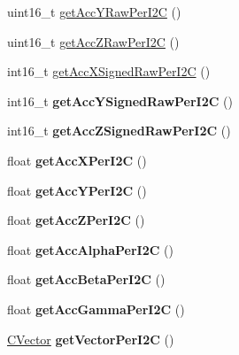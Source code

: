 \begin{DoxyCompactItemize}
\item 
uint16\-\_\-t \hyperlink{class_c_b_m_a180_a2b37888a1df1fd1d0c17c95bb6c7e15a}{get\-Acc\-Y\-Raw\-Per\-I2\-C} ()
\item 
uint16\-\_\-t \hyperlink{class_c_b_m_a180_accd1c61c0323e5acbd47cd1b1176084f}{get\-Acc\-Z\-Raw\-Per\-I2\-C} ()
\item 
int16\-\_\-t \hyperlink{class_c_b_m_a180_aca9a02a8a24b408f1a27de0f6303491f}{get\-Acc\-X\-Signed\-Raw\-Per\-I2\-C} ()
\item 
\hypertarget{class_c_b_m_a180_a76d299e0ede75e23c7c27b15391ffc2a}{int16\-\_\-t {\bfseries get\-Acc\-Y\-Signed\-Raw\-Per\-I2\-C} ()}\label{class_c_b_m_a180_a76d299e0ede75e23c7c27b15391ffc2a}

\item 
\hypertarget{class_c_b_m_a180_a70079e27326d0123a0b79ae2c2e1eb65}{int16\-\_\-t {\bfseries get\-Acc\-Z\-Signed\-Raw\-Per\-I2\-C} ()}\label{class_c_b_m_a180_a70079e27326d0123a0b79ae2c2e1eb65}

\item 
\hypertarget{class_c_b_m_a180_ab11c44f987669179c5172b1b77f9b633}{float {\bfseries get\-Acc\-X\-Per\-I2\-C} ()}\label{class_c_b_m_a180_ab11c44f987669179c5172b1b77f9b633}

\item 
\hypertarget{class_c_b_m_a180_ad60528a9b4b1c1ec6cad32b734930476}{float {\bfseries get\-Acc\-Y\-Per\-I2\-C} ()}\label{class_c_b_m_a180_ad60528a9b4b1c1ec6cad32b734930476}

\item 
\hypertarget{class_c_b_m_a180_a6d43bec30f5b932cc5615865af86a66a}{float {\bfseries get\-Acc\-Z\-Per\-I2\-C} ()}\label{class_c_b_m_a180_a6d43bec30f5b932cc5615865af86a66a}

\item 
\hypertarget{class_c_b_m_a180_a03c043a3e8ebb7cc7fac3c5153ba356d}{float {\bfseries get\-Acc\-Alpha\-Per\-I2\-C} ()}\label{class_c_b_m_a180_a03c043a3e8ebb7cc7fac3c5153ba356d}

\item 
\hypertarget{class_c_b_m_a180_afbc6e53796fead89dd732dd18f603d06}{float {\bfseries get\-Acc\-Beta\-Per\-I2\-C} ()}\label{class_c_b_m_a180_afbc6e53796fead89dd732dd18f603d06}

\item 
\hypertarget{class_c_b_m_a180_a8d1de9aea21c4ca82400eb5957e52166}{float {\bfseries get\-Acc\-Gamma\-Per\-I2\-C} ()}\label{class_c_b_m_a180_a8d1de9aea21c4ca82400eb5957e52166}

\item 
\hypertarget{class_c_b_m_a180_ab335f152d838dda55ac631835bc72702}{\hyperlink{class_c_vector}{\-C\-Vector} {\bfseries get\-Vector\-Per\-I2\-C} ()}\label{class_c_b_m_a180_ab335f152d838dda55ac631835bc72702}


\end{DoxyCompactItemize}

